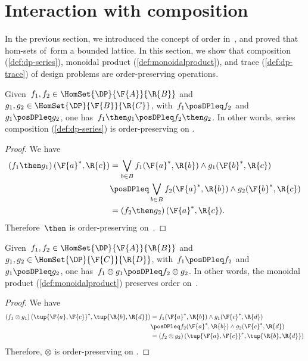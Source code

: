 

\section{Interaction with composition}


In the previous section, we introduced the concept of order in~\DP, and proved that hom-sets of~\DP form a bounded lattice. In this section, we show that composition (\cref{def:dp-series}), monoidal product (\cref{def:monoidalproduct}), and trace (\cref{def:dp-trace}) of design problems are order-preserving operations.
\begin{lemma}
  Given~$f_1,f_2 \in \HomSet{\DP}{\F{A}}{\R{B}}$ and~$g_1,g_2 \in \HomSet{\DP}{\F{B}}{\R{C}}$, with~$f_1\posDPleq f_2$ and~$g_1\posDPleq g_2$, one has~$f_1\then g_1 \posDPleq f_2\then g_2$. In other words, series composition (\cref{def:dp-series}) is order-preserving on \DP.
\end{lemma}

\begin{proof}
  We have
  \begin{equation}
    \begin{aligned}
      \left( f_1\then g_1\right)(\F{a}^*,\R{c})&=\bigvee_{b\in B}f_1(\F{a}^*,\R{b})\wedge g_1(\F{b}^*,\R{c})\\
      &\posDPleq \bigvee_{b\in B} f_2(\F{a}^*,\R{b})\wedge g_2(\F{b}^*,\R{c})\\
      &=\left( f_2\then g_2\right)(\F{a}^*,\R{c}).
    \end{aligned}
  \end{equation}
  Therefore~$\then$ is order-preserving on~\DP.
\end{proof}

\begin{lemma}
  Given~$f_1,f_2 \in \HomSet{\DP}{\F{A}}{\R{B}}$ and~$g_1,g_2 \in \HomSet{\DP}{\F{C}}{\R{D}}$, with~$f_1\posDPleq f_2$ and~$g_1\posDPleq g_2$, one has~$f_1\otimes g_1 \posDPleq f_2\otimes g_2$. In other words, the monoidal product (\cref{def:monoidalproduct}) preserves order on~\DP.
\end{lemma}

\begin{proof}
  We have
  \begin{equation}
    \begin{aligned}
      \left( f_1\otimes g_1\right) (\tup{\F{a},\F{c}}^*,\tup{\R{b},\R{d}})&=f_1(\F{a}^*,\R{b})\wedge g_1(\F{c}^*,\R{d})\\
      &\posDPleq f_2(\F{a}^*,\R{b})\wedge g_2(\F{c}^*,\R{d})\\
      &=\left( f_2\otimes g_2\right) (\tup{\F{a},\F{c}}^*,\tup{\R{b},\R{d}})
    \end{aligned}
  \end{equation}
  Therefore, $\otimes$ is order-preserving on \DP.
\end{proof}

